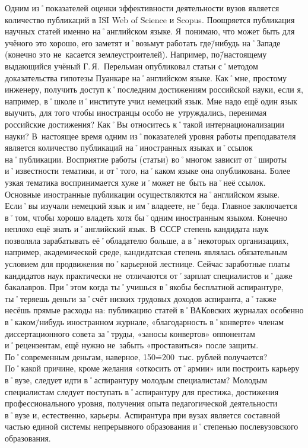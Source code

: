 \begin{drama}
	\maxspeaks Одним из˚показателей оценки эффективности деятельности вузов является количество публикаций в ISI Web of Science и Scopus. Поощряется публикация научных статей именно на˚английском языке. Я~понимаю, что может быть для учёного это хорошо, его заметят и˚возьмут работать где\=/нибудь на˚Западе (конечно это не~касается землеустроителей). Например, по\=/настоящему выдающийся учёный Г.\,Я.~Перельман опубликовал статьи с˚методом доказательства гипотезы Пуанкаре на˚английском языке. Как˚мне, простому инженеру, получить доступ к˚последним достижениям российской науки, если я, например, в˚школе и˚институте учил немецкий язык. Мне надо ещё один язык выучить, для того чтобы иностранцы особо не~утруждались, перенимая российские достижения? Как˚Вы относитесь к˚такой интернационализации науки?
	\michaelspeaks В~настоящее время одним из˚показателей уровня работы преподавателя является количество публикаций на˚иностранных языках и˚ссылок на˚публикации. Восприятие работы (статьи) во˚многом зависит от˚широты и˚известности тематики, и от˚того, на˚каком языке она опубликована. Более узкая тематика воспринимается хуже и˚может не~быть на˚неё ссылок. Основные иностранные публикации осуществляются на˚английском языке. Если˚вы изучали немецкий язык и им˚владеете, не˚беда. Главное заключается в˚том, чтобы хорошо владеть хотя бы˚одним иностранным языком. Конечно неплохо ещё знать и˚английский язык.
	\maxspeaks В~СССР степень кандидата наук позволяла зарабатывать её˚обладателю больше, а в˚некоторых организациях, например, академической среде, кандидатская степень являлась обязательным условием для продвижения по˚карьерной лестнице. Сейчас заработные платы кандидатов наук практически не~отличаются от˚зарплат специалистов и˚даже бакалавров. При˚этом когда ты˚учишься в˚якобы бесплатной аспирантуре, ты˚теряешь деньги за˚счёт низких трудовых доходов аспиранта, а˚также несёшь прямые расходы на: публикацию статей в˚ВАКовских журналах особенно в˚каком\=/нибудь иностранном журнале,  «благодарность в˚конверте» членам диссертационного совета за˚труды,  «заносы конвертов» оппонентам и˚рецензентам, ещё нужно не~забыть  «проставиться» после защиты. По˚современным деньгам, наверное, 150\==200~тыс. рублей получается? По˚какой причине, кроме желания  «откосить от˚армии» или построить карьеру в˚вузе, следует идти в˚аспирантуру молодым специалистам?
	\michaelspeaks Молодым специалистам следует поступать в˚аспирантуру для престижа, достижения профессионального уровня, получения опыта педагогической деятельности в˚вузе и, естественно, карьеры. Аспирантура при вузах является составной частью единой системы непрерывного образования и˚степенью послевузовского образования.

\end{drama}
